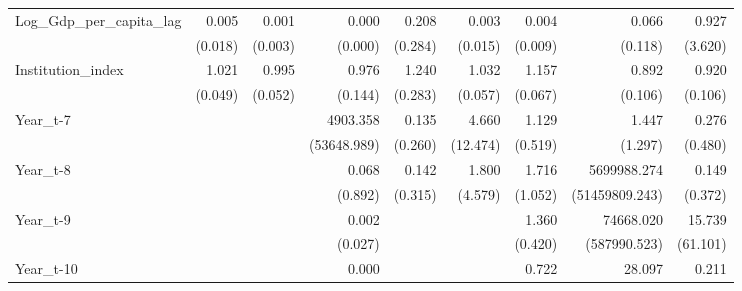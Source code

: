 \begin{table}[htbp]
\begin{tabular}{l*{8}{D{.}{.}{-1}}}
Log\_Gdp\_per\_capita\_lag&       0.005\sym{\%}  &       0.001\sym{*}  &       0.000\sym{***}&       0.208         &       0.003         &       0.004\sym{**} &       0.066\sym{\%}  &       0.927         \\
                    &     (0.018)         &     (0.003)         &     (0.000)         &     (0.284)         &     (0.015)         &     (0.009)         &     (0.118)         &     (3.620)         \\
Institution\_index   &       1.021         &       0.995         &       0.976         &       1.240         &       1.032         &       1.157\sym{**} &       0.892         &       0.920         \\
                    &     (0.049)         &     (0.052)         &     (0.144)         &     (0.283)         &     (0.057)         &     (0.067)         &     (0.106)         &     (0.106)         \\
Year\_t-7            &                     &                     &    4903.358         &       0.135         &       4.660         &       1.129         &       1.447         &       0.276         \\
                    &                     &                     & (53648.989)         &     (0.260)         &    (12.474)         &     (0.519)         &     (1.297)         &     (0.480)         \\
Year\_t-8            &                     &                     &       0.068         &       0.142         &       1.800         &       1.716         & 5699988.274\sym{*}  &       0.149         \\
                    &                     &                     &     (0.892)         &     (0.315)         &     (4.579)         &     (1.052)         &(51459809.243)         &     (0.372)         \\
Year\_t-9            &                     &                     &       0.002         &                     &                     &       1.360         &   74668.020         &      15.739         \\
                    &                     &                     &     (0.027)         &                     &                     &     (0.420)         &(587990.523)         &    (61.101)         \\
Year\_t-10           &                     &                     &       0.000\sym{**} &                     &                     &       0.722         &      28.097         &       0.211         \\

\end{tabular}
\end{table}
